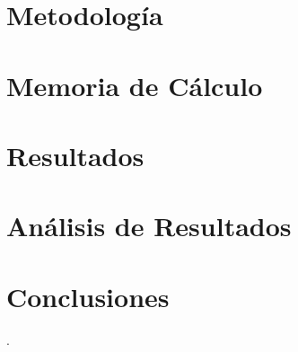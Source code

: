 \documentclass[letterpaper,11pt]{article} %
\begin{document}
\section{Metodología}

\newpage
\section{Memoria de Cálculo}


\newpage
\section{Resultados}





\newpage
\section{Análisis de Resultados}



\newpage
\section{Conclusiones}.




\end{document}
